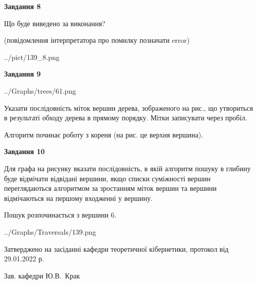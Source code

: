 \documentclass[12pt, ukrainian]{article}
\begin{document}
{\begin {large}
{\begin {center}\textbf{Завдання 8}\end {center}}\par
Що буде виведено за виконання?\par
 (повідомлення інтерпретатора про помилку позначати error)\par
\begin{center}
	{../pict/139_8.png}
\end{center}
\newpage

{\begin {center}\textbf{Завдання 9}\end {center}}\par

\begin{center}
	{../Graphs/trees/61.png}
\end{center}
Указати послідовність міток вершин дерева, зображеного на рис., що утвориться в результаті обходу дерева в прямому порядку. Мітки записувати через пробіл.\par Алгоритм починає роботу з кореня (на рис. це верхня вершина).\par
\newpage

{\begin {center}\textbf{Завдання 10}\end {center}}\par
Для графа на рисунку вказати послідовність, в якій алгоритм пошуку в глибину буде відмічати відвідані вершини, якщо списки суміжності вершин переглядаються алгоритмом за зростанням міток вершин та вершини відмічаються на першому вход\-женні у вершину.\par
Пошук розпочинається з вершини 6.\par

\begin{center}
	{../Graphs/Traversals/139.png}
\end{center}\par
\newpage


\end {large}
}
{\smallskip \begin {small} Затверджено на засіданні кафедри теоретичної кібернетики, протокол  від   29.01.2022 р.\par\smallskip\smallskip
{\parbox {6.5 cm}{Зав. кафедри \dotfill Ю.В.~Крак}} \end{small}}
\end{document}
